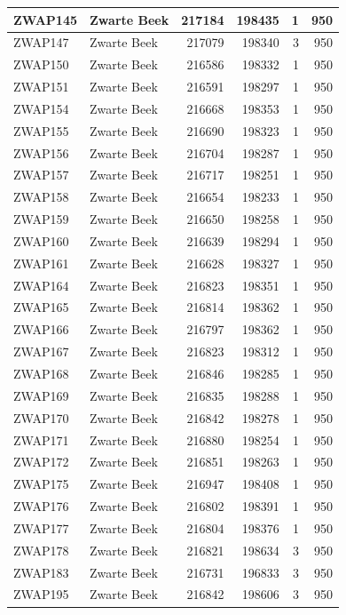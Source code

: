 \documentclass[11pt,]{book}
\begin{document}
\begin{table}
\begin{tabular}[t]{l|l|r|r|r|r}
\hline
ZWAP145 & Zwarte Beek & 217184 & 198435 & 1 & 950\\
\hline
ZWAP147 & Zwarte Beek & 217079 & 198340 & 3 & 950\\
\hline
ZWAP150 & Zwarte Beek & 216586 & 198332 & 1 & 950\\
\hline
ZWAP151 & Zwarte Beek & 216591 & 198297 & 1 & 950\\
\hline
ZWAP154 & Zwarte Beek & 216668 & 198353 & 1 & 950\\
\hline
ZWAP155 & Zwarte Beek & 216690 & 198323 & 1 & 950\\
\hline
ZWAP156 & Zwarte Beek & 216704 & 198287 & 1 & 950\\
\hline
ZWAP157 & Zwarte Beek & 216717 & 198251 & 1 & 950\\
\hline
ZWAP158 & Zwarte Beek & 216654 & 198233 & 1 & 950\\
\hline
ZWAP159 & Zwarte Beek & 216650 & 198258 & 1 & 950\\
\hline
ZWAP160 & Zwarte Beek & 216639 & 198294 & 1 & 950\\
\hline
ZWAP161 & Zwarte Beek & 216628 & 198327 & 1 & 950\\
\hline
ZWAP164 & Zwarte Beek & 216823 & 198351 & 1 & 950\\
\hline
ZWAP165 & Zwarte Beek & 216814 & 198362 & 1 & 950\\
\hline
ZWAP166 & Zwarte Beek & 216797 & 198362 & 1 & 950\\
\hline
ZWAP167 & Zwarte Beek & 216823 & 198312 & 1 & 950\\
\hline
ZWAP168 & Zwarte Beek & 216846 & 198285 & 1 & 950\\
\hline
ZWAP169 & Zwarte Beek & 216835 & 198288 & 1 & 950\\
\hline
ZWAP170 & Zwarte Beek & 216842 & 198278 & 1 & 950\\
\hline
ZWAP171 & Zwarte Beek & 216880 & 198254 & 1 & 950\\
\hline
ZWAP172 & Zwarte Beek & 216851 & 198263 & 1 & 950\\
\hline
ZWAP175 & Zwarte Beek & 216947 & 198408 & 1 & 950\\
\hline
ZWAP176 & Zwarte Beek & 216802 & 198391 & 1 & 950\\
\hline
ZWAP177 & Zwarte Beek & 216804 & 198376 & 1 & 950\\
\hline
ZWAP178 & Zwarte Beek & 216821 & 198634 & 3 & 950\\
\hline
ZWAP183 & Zwarte Beek & 216731 & 196833 & 3 & 950\\
\hline
ZWAP195 & Zwarte Beek & 216842 & 198606 & 3 & 950\\

\end{tabular}
\end{table}
\end{document}
